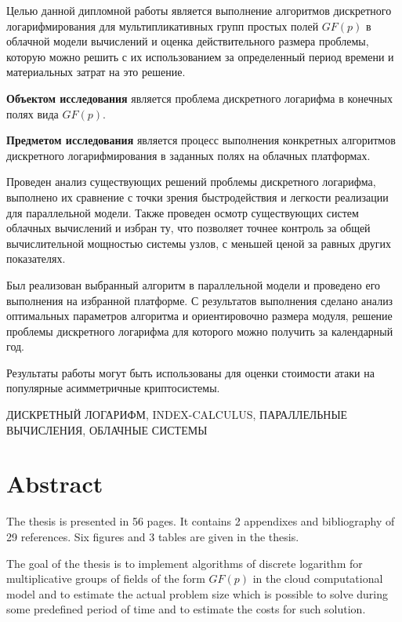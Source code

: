 Целью данной дипломной работы является выполнение алгоритмов дискретного логарифмирования для мультипликативных групп простых полей $GF(p)$ в облачной модели вычислений и оценка действительного размера проблемы, которую можно решить с их использованием за определенный период времени и материальных затрат на это решение.

\textbf{Объектом исследования} является проблема дискретного логарифма в конечных полях вида $GF(p)$.

\textbf{Предметом исследования} является процесс выполнения конкретных алгоритмов дискретного логарифмирования в заданных полях на облачных платформах.

Проведен анализ существующих решений проблемы дискретного логарифма, выполнено их сравнение с точки зрения быстродействия и легкости реализации для параллельной модели. Также проведен осмотр существующих систем облачных вычислений и избран ту, что позволяет точнее контроль за общей вычислительной мощностью системы узлов, с меньшей ценой за равных других показателях.

Был реализован выбранный алгоритм в параллельной модели и проведено его выполнения на избранной платформе. С результатов выполнения сделано анализ оптимальных параметров алгоритма и ориентировочно размера модуля, решение проблемы дискретного логарифма для которого можно получить за календарный год.

Результаты работы могут быть использованы для оценки стоимости атаки на популярные асимметричные криптосистемы.

\MakeUppercase{Дискретный логарифм, INDEX-CALCULUS, параллельные вычисления, облачные системы}

\chapter*{Abstract}
\pagestyle{plain}
The thesis is presented in 56 pages. It contains 2 appendixes and bibliography of 29 references. Six figures and 3 tables are given in the thesis. 


The goal of the thesis is to implement algorithms of discrete logarithm for multiplicative groups of fields of the form $GF(p)$ in the cloud computational model and to estimate the actual problem size which is possible to solve during some predefined period of time and to estimate the costs for such solution.

